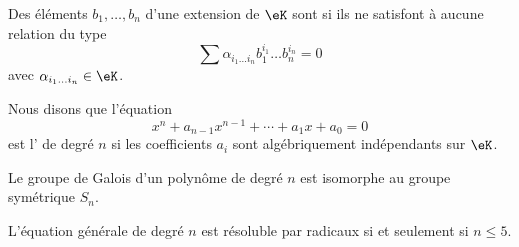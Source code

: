 \begin{definition}
	Des éléments \( b_1,\ldots, b_n\) d'une extension de \( \eK\) sont  si ils ne satisfont à aucune relation du type
	\begin{equation}
		\sum \alpha_{i_1\ldots i_n}b_1^{i_1}\ldots b_n^{i_n}=0
	\end{equation}
	avec \( \alpha_{i_1\ldots i_n}\in \eK\).
\end{definition}

Nous disons que l'équation
\begin{equation}
	x^n+a_{n-1}x^{n-1}+\cdots+a_1x+a_0=0
\end{equation}
est l' de degré \( n\) si les coefficients \( a_i\) sont algébriquement indépendants sur \( \eK\).

\begin{theorem}     \label{THOooDTCXooTIOSZe}
	Le groupe de Galois d'un polynôme de degré \( n\) est isomorphe au groupe symétrique \( S_n\).
\end{theorem}

\begin{corollary}      \label{CORooBRKTooBWldRC}
	L'équation générale de degré \( n\) est résoluble par radicaux si et seulement si \( n\le 5\).
\end{corollary}
